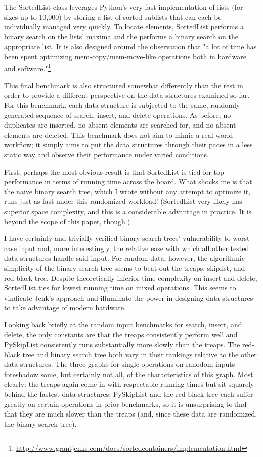 \documentclass{article}
\begin{document}
The SortedList class leverages Python's very fast implementation of lists (for sizes up to 10,000) by storing a list of sorted sublists that can each be individually managed very quickly. To locate elements, SortedList performs a binary search on the lists' maxima and the performs a binary search on the appropriate list. It is also designed around the observation that "a lot of time has been spent optimizing mem-copy/mem-move-like operations both in hardware and software."\footnote{\url{http://www.grantjenks.com/docs/sortedcontainers/implementation.html}}

This final benchmark is also structured somewhat differently than the rest in order to provide a different perspective on the data structures examined so far. For this benchmark, each data structure is subjected to the same, randomly generated sequence of search, insert, and delete operations. As before, no duplicates are inserted, no absent elements are searched for, and no absent elements are deleted. This benchmark does not aim to mimic a real-world workflow; it simply aims to put the data structures through their paces in a less static way and observe their performance under varied conditions.



First, perhaps the most obvious result is that SortedList is tied for top performance in terms of running time across the board. What shocks me is that the naive binary search tree, which I wrote without any attempt to optimize it, runs just as fast under this randomized workload! (SortedList very likely has superior space complexity, and this is a considerable advantage in practice. It is beyond the scope of this paper, though.) 

I have certainly and trivially verified binary search trees' vulnerability to worst-case input and, more interestingly, the relative ease with which all other tested data structures handle said input. For random data, however, the algorithmic simplicity of the binary search tree seems to beat out the treaps, skiplist, and red-black tree. Despite theoretically inferior time complexity on insert and delete, SortedList ties for lowest running time on mixed operations. This seems to vindicate Jenk's approach and illuminate the power in designing data structures to take advantage of modern hardware.

Looking back briefly at the random input benchmarks for search, insert, and delete, the only constants are that the treaps consistently perform well and PySkipList consistently runs substantially more slowly than the treaps. The red-black tree and binary search tree both vary in their rankings relative to the other data structures. The three graphs for single operations on ranodom inputs foreshadow some, but certainly not all, of the characteristics of this graph. Most clearly: the treaps again come in with respectable running times but sit squarely behind the fastest data structures. PySkipList and the red-black tree each suffer greatly on certain operations in prior benchmarks, so it is unsurprising to find that they are much slower than the treaps (and, since these data are randomized, the binary search tree). 
\end{document}
